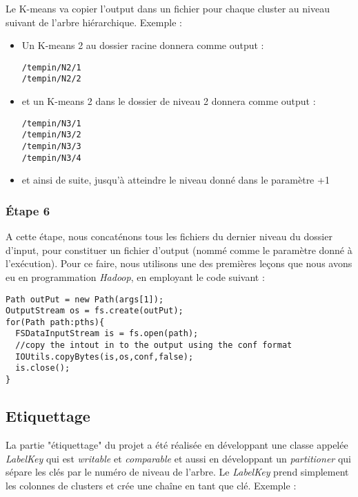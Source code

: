 \documentclass[12pt]{article}
\begin{document}
Le K-means va copier l'output dans un fichier pour chaque cluster au niveau suivant de l'arbre hiérarchique. Exemple :

\begin{itemize}
\item Un K-means 2 au dossier racine donnera comme output :

\begin{verbatim}
/tempin/N2/1
/tempin/N2/2
\end{verbatim}

\item et un K-means 2 dans le dossier de niveau 2 donnera comme output :

\begin{verbatim}
/tempin/N3/1
/tempin/N3/2
/tempin/N3/3
/tempin/N3/4
\end{verbatim}

\item et ainsi de suite, jusqu'à atteindre le niveau donné dans le paramètre +1
\end{itemize}

\subsubsection{Étape 6}
\label{sec:org23c7f99}

A cette étape, nous concaténons tous les fichiers du dernier niveau du dossier d'input, pour constituer un fichier 
d'output (nommé comme le paramètre donné à l'exécution). Pour ce faire, nous utilisons une des premières leçons que nous
avons eu en programmation \emph{Hadoop}, en employant le code suivant : 

\begin{verbatim}
Path outPut = new Path(args[1]);
OutputStream os = fs.create(outPut);
for(Path path:pths){
  FSDataInputStream is = fs.open(path);
  //copy the intout in to the output using the conf format
  IOUtils.copyBytes(is,os,conf,false);
  is.close();
}
\end{verbatim}

\subsection{Etiquettage}
\label{sec:org96d6485}

La partie "étiquettage" du projet a été réalisée en développant une classe appelée \emph{LabelKey} qui est \emph{writable} 
et \emph{comparable} et aussi en développant un \emph{partitioner} qui sépare les clés par le numéro de niveau de l'arbre.
Le \emph{LabelKey} prend simplement les colonnes de clusters et crée une chaîne en tant que clé. Exemple : 
\end{document}
